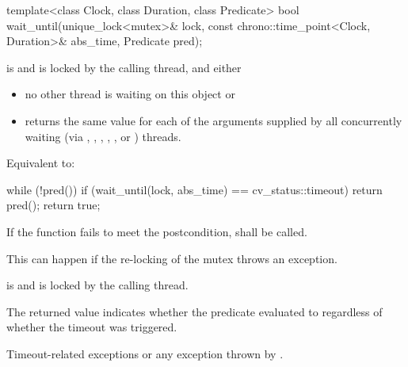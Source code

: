 %
\begin{itemdecl}
template<class Clock, class Duration, class Predicate>
  bool wait_until(unique_lock<mutex>& lock,
                  const chrono::time_point<Clock, Duration>& abs_time,
                  Predicate pred);
\end{itemdecl}
\begin{itemdescr}
 \pnum \requires {} is  and  is
                locked by the calling thread, and either

        \begin{itemize}
        \item no other thread is waiting on this  object or
        \item {} returns the same value for each of the 
                arguments supplied by all concurrently waiting (via ,
                , 
                {\color{insertcolor}, , , or }) threads.
        \end{itemize}

 \pnum \effects Equivalent to:
\begin{codeblock}
while (!pred())
  if (wait_until(lock, abs_time) == cv_status::timeout)
    return pred();
return true;
\end{codeblock}

 \pnum \remarks
        If the function fails to meet the postcondition, 
        shall be called.
        \begin{note} This can happen if the re-locking of the mutex throws an exception. \end{note}

 \pnum \postconditions {} is  and 
        is locked by the calling thread.

 \pnum \begin{note} The returned value indicates whether the predicate evaluated to
         regardless of whether the timeout was triggered. \end{note}

 \pnum \throws Timeout-related exceptions or any exception thrown by .
\end{itemdescr}



